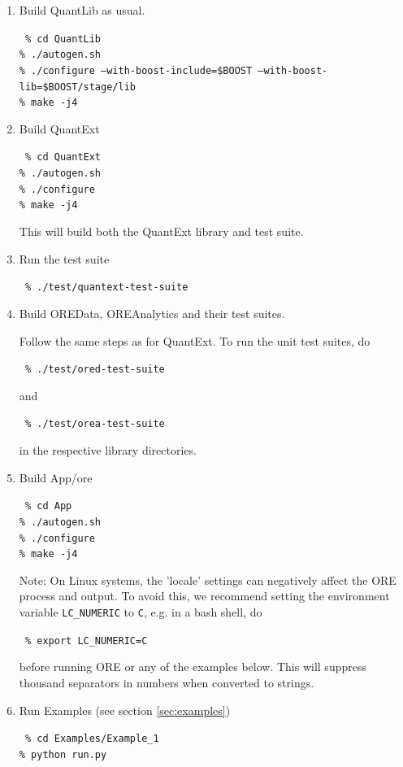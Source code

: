 \documentclass[12pt, a4paper]{article}
\begin{document}
\begin{enumerate}

\item Build QuantLib as usual.

{\tt\footnotesize
\% cd QuantLib \\
\% ./autogen.sh \\
\% ./configure --with-boost-include=\$BOOST --with-boost-lib=\$BOOST/stage/lib \\
\% make -j4 
}

\item Build QuantExt

{\tt\footnotesize
\% cd QuantExt \\
\% ./autogen.sh \\
\% ./configure \\
\% make -j4
}

This will build both the QuantExt library and test suite.

\item Run the test suite

{\tt\footnotesize
\% ./test/quantext-test-suite 
}

\item  Build OREData, OREAnalytics and their test suites. 

Follow the same steps as for QuantExt.
To run the unit test suites, do 

{\tt\footnotesize
\% ./test/ored-test-suite 
}

and 

{\tt\footnotesize
\% ./test/orea-test-suite 
}

in the respective library directories.

\item Build App/ore

{\tt\footnotesize
\% cd App \\
\% ./autogen.sh \\
\% ./configure \\
\% make -j4
}

Note: On Linux systems, the 'locale' settings can negatively affect the ORE process and output. To avoid this, we
recommend setting the environment variable {\tt LC\_NUMERIC} to {\tt C}, e.g. in a bash shell, do

{\tt\footnotesize
\% export LC\_NUMERIC=C
}

before running ORE or any of the examples below. This will suppress thousand separators in numbers when converted to
strings.

\item Run Examples (see section \ref{sec:examples})

{\tt\footnotesize
\% cd Examples/Example\_1 \\
\% python run.py 
}

\end{enumerate}
\end{document}
